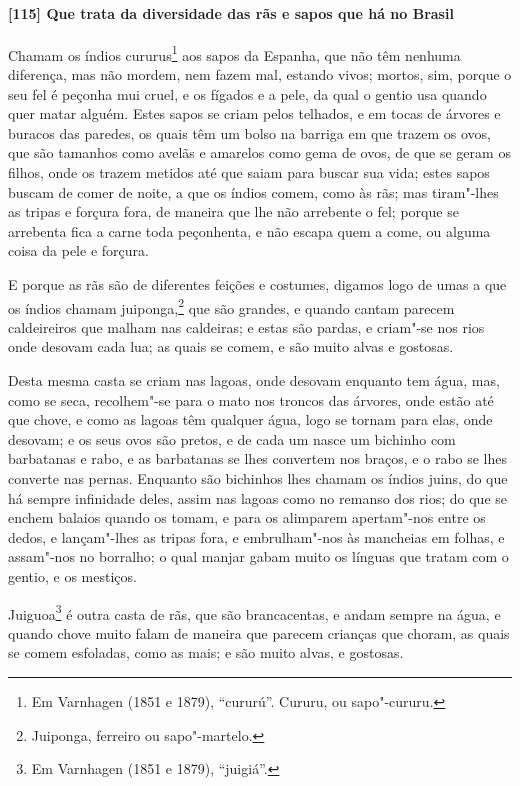 \paragraph{[115] Que trata da diversidade das rãs e sapos que há no Brasil}\quad
Chamam os índios cururus\footnote{ Em Varnhagen (1851 e 1879), ``cururú''. Cururu, ou
sapo"-cururu.} aos sapos da Espanha, que não têm nenhuma diferença, mas não mordem, nem
fazem mal, estando vivos; mortos, sim, porque o seu fel é peçonha mui cruel, e os fígados
e a pele, da qual o gentio usa quando quer matar alguém. Estes sapos se criam pelos
telhados, e em tocas de árvores e buracos das paredes, os quais têm um bolso na barriga em
que trazem os ovos, que são tamanhos como avelãs e amarelos como gema de ovos, de que se
geram os filhos, onde os trazem metidos até que saiam para buscar sua vida; estes sapos
buscam de comer de noite, a que os índios comem, como às rãs; mas tiram"-lhes as tripas e
forçura fora, de maneira que lhe não arrebente o fel; porque se arrebenta fica a carne
toda peçonhenta, e não escapa quem a come, ou alguma coisa da pele e forçura.

E porque as rãs são de diferentes feições e costumes, digamos logo de umas a que os índios
chamam juiponga,\footnote{ Juiponga, ferreiro ou sapo"-martelo.} que são grandes, e quando
cantam parecem caldeireiros que malham nas caldeiras; e estas são pardas, e criam"-se nos
rios onde desovam cada lua; as quais se comem, e são muito alvas e gostosas.

Desta mesma casta se criam nas lagoas, onde desovam enquanto tem água, mas, como se seca,
recolhem"-se para o mato nos troncos das árvores, onde estão até que chove, e como as
lagoas têm qualquer água, logo se tornam para elas, onde desovam; e os seus ovos são
pretos, e de cada um nasce um bichinho com barbatanas e rabo, e as barbatanas se lhes
convertem nos braços, e o rabo se lhes converte nas pernas. Enquanto são bichinhos lhes
chamam os índios juins, do que há sempre infinidade deles, assim nas lagoas como no
remanso dos rios; do que se enchem balaios quando os tomam, e para os alimparem
apertam"-nos entre os dedos, e lançam"-lhes as tripas fora, e embrulham"-nos às mancheias em
folhas, e assam"-nos no borralho; o qual manjar gabam muito os línguas que tratam com o
gentio, e os mestiços.

Juiguoa\footnote{ Em Varnhagen (1851 e 1879), ``juigiá''.} é outra casta de rãs, que são
brancacentas, e andam sempre na água, e quando chove muito falam de maneira que parecem
crianças que choram, as quais se comem esfoladas, como as mais; e são muito alvas, e
gostosas.

